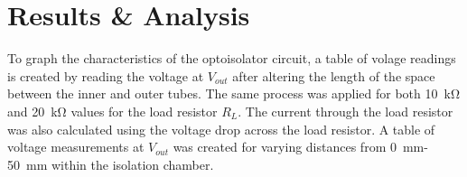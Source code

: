 \documentclass[CMPE]{../KGCOEReport}
\begin{document}
    \section*{Results \& Analysis}

	To graph the characteristics of the optoisolator circuit, a table of volage readings
	is created by reading the voltage at $V_{out}$ after altering the length of
	the space between the inner and outer tubes. The same process was applied for both
	\SI{10}{\kilo\ohm} and \SI{20}{\kilo\ohm} values for the load resistor $R_L$.
	The current through the load resistor was also calculated using the voltage drop
	across the load resistor. A table of voltage measurements at $V_{out}$ was created for
	varying distances from \SI{0}{\milli\metre}-\SI{50}{\milli\metre} within the isolation
	chamber.
\end{document}
